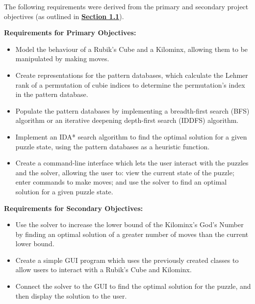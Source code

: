 The following requirements were derived from the primary and secondary project objectives (as outlined in \textbf{\hyperref[section:objectives]{Section 1.1}}).

\textbf{Requirements for Primary Objectives:}
\begin{itemize}
    \item Model the behaviour of a Rubik's Cube and a Kilominx, allowing them to be manipulated by making moves.
    \item Create representations for the pattern databases, which calculate the Lehmer rank of a permutation of cubie indices to determine the permutation's index in the pattern database.
    \item Populate the pattern databases by implementing a breadth-first search (BFS) algorithm or an iterative deepening depth-first search (IDDFS) algorithm.
    \item Implement an IDA* search algorithm to find the optimal solution for a given puzzle state, using the pattern databases as a heuristic function.
    \item Create a command-line interface which lets the user interact with the puzzles and the solver, allowing the user to: view the current state of the puzzle; enter commands to make moves; and use the solver to find an optimal solution for a given puzzle state.
\end{itemize}

\textbf{Requirements for Secondary Objectives:}
\begin{itemize}
    \item Use the solver to increase the lower bound of the Kilominx's God's Number by finding an optimal solution of a greater number of moves than the current lower bound.
    \item Create a simple GUI program which uses the previously created classes to allow users to interact with a Rubik's Cube and Kilominx.
    \item Connect the solver to the GUI to find the optimal solution for the puzzle, and then display the solution to the user.
\end{itemize}